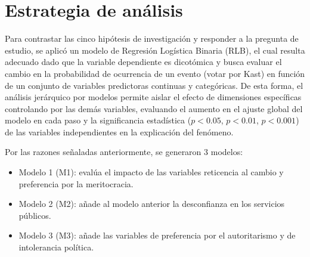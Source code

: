 \documentclass[
  spanish,
  a4paper,
  oneside]{scrbook}
\begin{document}
\section{Estrategia de análisis}\label{estrategia-de-anuxe1lisis}

Para contrastar las cinco hipótesis de investigación y responder a la
pregunta de estudio, se aplicó un modelo de Regresión Logística Binaria
(RLB), el cual resulta adecuado dado que la variable dependiente es
dicotómica y busca evaluar el cambio en la probabilidad de ocurrencia de
un evento (votar por Kast) en función de un conjunto de variables
predictoras continuas y categóricas. De esta forma, el análisis
jerárquico por modelos permite aislar el efecto de dimensiones
específicas controlando por las demás variables, evaluando el aumento en
el ajuste global del modelo en cada paso y la significancia estadística
(\(p < 0.05\), \(p < 0.01\), \(p < 0.001\)) de las variables
independientes en la explicación del fenómeno.

Por las razones señaladas anteriormente, se generaron 3 modelos:

\begin{itemize}
\item
  Modelo 1 (M1): evalúa el impacto de las variables reticencia al cambio
  y preferencia por la meritocracia.
\item
  Modelo 2 (M2): añade al modelo anterior la desconfianza en los
  servicios públicos.
\item
  Modelo 3 (M3): añade las variables de preferencia por el autoritarismo
  y de intolerancia política.
\end{itemize}
\end{document}
